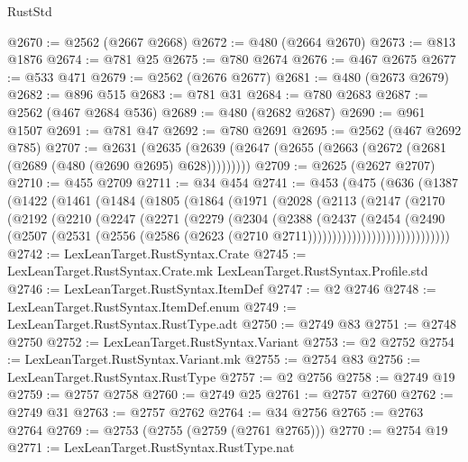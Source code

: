 \begin{lexlean}{RustStd}
\begin{coremodule}
@2670 := @2562 (@2667 @2668)
@2672 := @480 (@2664 @2670)
@2673 := @813 @1876
@2674 := @781 @25
@2675 := @780 @2674
@2676 := @467 @2675
@2677 := @533 @471
@2679 := @2562 (@2676 @2677)
@2681 := @480 (@2673 @2679)
@2682 := @896 @515
@2683 := @781 @31
@2684 := @780 @2683
@2687 := @2562 (@467 @2684 @536)
@2689 := @480 (@2682 @2687)
@2690 := @961 @1507
@2691 := @781 @47
@2692 := @780 @2691
@2695 := @2562 (@467 @2692 @785)
@2707 := @2631
    (@2635 (@2639 (@2647 (@2655 (@2663 (@2672 (@2681 (@2689 (@480 (@2690 @2695) @628)))))))))
@2709 := @2625 (@2627 @2707)
@2710 := @455 @2709
@2711 := @34 @454
@2741 := @453
    (@475
      (@636
        (@1387
          (@1422
            (@1461
              (@1484
                (@1805
                  (@1864
                    (@1971
                      (@2028
                        (@2113
                          (@2147
                            (@2170
                              (@2192
                                (@2210
                                  (@2247
                                    (@2271
                                      (@2279
                                        (@2304
                                          (@2388
                                            (@2437
                                              (@2454
                                                (@2490
                                                  (@2507
                                                    (@2531
                                                      (@2556
                                                        (@2586
                                                          (@2623
                                                            (@2710
                                                              @2711)))))))))))))))))))))))))))))
@2742 := LexLeanTarget.RustSyntax.Crate
@2745 := LexLeanTarget.RustSyntax.Crate.mk LexLeanTarget.RustSyntax.Profile.std
@2746 := LexLeanTarget.RustSyntax.ItemDef
@2747 := @2 @2746
@2748 := LexLeanTarget.RustSyntax.ItemDef.enum
@2749 := LexLeanTarget.RustSyntax.RustType.adt
@2750 := @2749 @83
@2751 := @2748 @2750
@2752 := LexLeanTarget.RustSyntax.Variant
@2753 := @2 @2752
@2754 := LexLeanTarget.RustSyntax.Variant.mk
@2755 := @2754 @83
@2756 := LexLeanTarget.RustSyntax.RustType
@2757 := @2 @2756
@2758 := @2749 @19
@2759 := @2757 @2758
@2760 := @2749 @25
@2761 := @2757 @2760
@2762 := @2749 @31
@2763 := @2757 @2762
@2764 := @34 @2756
@2765 := @2763 @2764
@2769 := @2753 (@2755 (@2759 (@2761 @2765)))
@2770 := @2754 @19
@2771 := LexLeanTarget.RustSyntax.RustType.nat

\end{coremodule}
\end{lexlean}
